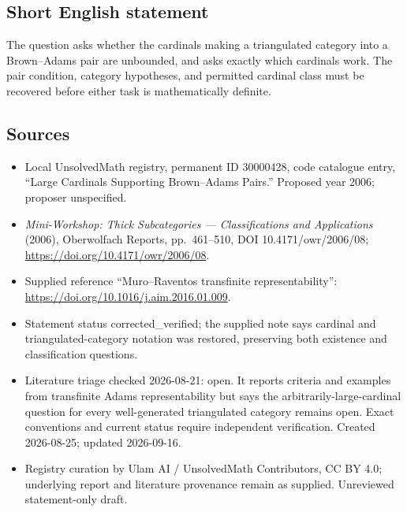 \documentclass[11pt]{article}
\begin{document}
\subsection{Short English statement}
The question asks whether the cardinals making a triangulated category into a Brown--Adams pair are unbounded, and asks exactly which cardinals work. The pair condition, category hypotheses, and permitted cardinal class must be recovered before either task is mathematically definite.
\subsection{Sources}
\begin{itemize}
\item Local UnsolvedMath registry, permanent ID 30000428, code catalogue entry, ``Large Cardinals Supporting Brown--Adams Pairs.'' Proposed year 2006; proposer unspecified.
\item \emph{Mini-Workshop: Thick Subcategories --- Classifications and Applications} (2006), Oberwolfach Reports, pp.\ 461--510, DOI 10.4171/owr/2006/08; \url{https://doi.org/10.4171/owr/2006/08}.
\item Supplied reference ``Muro--Raventos transfinite representability'': \url{https://doi.org/10.1016/j.aim.2016.01.009}.
\item Statement status corrected\_verified; the supplied note says cardinal and triangulated-category notation was restored, preserving both existence and classification questions.
\item Literature triage checked 2026-08-21: open. It reports criteria and examples from transfinite Adams representability but says the arbitrarily-large-cardinal question for every well-generated triangulated category remains open. Exact conventions and current status require independent verification. Created 2026-08-25; updated 2026-09-16.
\item Registry curation by Ulam AI / UnsolvedMath Contributors, CC BY 4.0; underlying report and literature provenance remain as supplied. Unreviewed statement-only draft.
\end{itemize}
\end{document}
